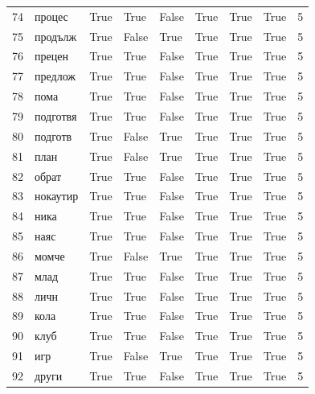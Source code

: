 \begin{longtable}{rlllllllr}
  74 &      процес &     True &   True &  False &       True &           True &      True &      5 \\
  75 &     продълж &     True &  False &   True &       True &           True &      True &      5 \\
  76 &      прецен &     True &   True &  False &       True &           True &      True &      5 \\
  77 &     предлож &     True &   True &  False &       True &           True &      True &      5 \\
  78 &        пома &     True &   True &  False &       True &           True &      True &      5 \\
  79 &    подготвя &     True &   True &  False &       True &           True &      True &      5 \\
  80 &     подготв &     True &  False &   True &       True &           True &      True &      5 \\
  81 &        план &     True &  False &   True &       True &           True &      True &      5 \\
  82 &       обрат &     True &   True &  False &       True &           True &      True &      5 \\
  83 &    нокаутир &     True &   True &  False &       True &           True &      True &      5 \\
  84 &        ника &     True &   True &  False &       True &           True &      True &      5 \\
  85 &        наяс &     True &   True &  False &       True &           True &      True &      5 \\
  86 &       момче &     True &  False &   True &       True &           True &      True &      5 \\
  87 &        млад &     True &   True &  False &       True &           True &      True &      5 \\
  88 &        личн &     True &   True &  False &       True &           True &      True &      5 \\
  89 &        кола &     True &   True &  False &       True &           True &      True &      5 \\
  90 &        клуб &     True &   True &  False &       True &           True &      True &      5 \\
  91 &         игр &     True &  False &   True &       True &           True &      True &      5 \\
  92 &       други &     True &   True &  False &       True &           True &      True &      5 \\

\end{longtable}
